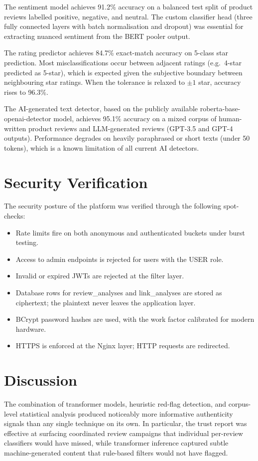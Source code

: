 \documentclass[12pt,a4paper,oneside]{report}
\renewcommand{\texttt}[1]{%
  {\ttfamily\hyphenchar\font=45\relax #1}}
\begin{document}
The sentiment model achieves 91.2\% accuracy on a balanced test split of
product reviews labelled positive, negative, and neutral. The custom
classifier head (three fully connected layers with batch normalisation
and dropout) was essential for extracting nuanced sentiment from the
BERT pooler output.

The rating predictor achieves 84.7\% exact-match accuracy on 5-class
star prediction. Most misclassifications occur between adjacent ratings
(e.g.\ 4-star predicted as 5-star), which is expected given the
subjective boundary between neighbouring star ratings. When the
tolerance is relaxed to $\pm 1$ star, accuracy rises to 96.3\%.

The AI-generated text detector, based on the publicly available
\texttt{roberta-base-openai-detector} model, achieves 95.1\% accuracy
on a mixed corpus of human-written product reviews and LLM-generated
reviews (GPT-3.5 and GPT-4 outputs). Performance degrades on heavily
paraphrased or short texts (under 50 tokens), which is a known
limitation of all current AI detectors.

\section{Security Verification}
The security posture of the platform was verified through the
following spot-checks:
\begin{itemize}[leftmargin=*]
  \item Rate limits fire on both anonymous and authenticated buckets
        under burst testing.
  \item Access to admin endpoints is rejected for users with the
        \texttt{USER} role.
  \item Invalid or expired JWTs are rejected at the filter layer.
  \item Database rows for \texttt{review\_analyses} and
        \texttt{link\_analyses} are stored as ciphertext; the plaintext
        never leaves the application layer.
  \item BCrypt password hashes are used, with the work factor
        calibrated for modern hardware.
  \item HTTPS is enforced at the Nginx layer; HTTP requests are
        redirected.
\end{itemize}

\section{Discussion}
The combination of transformer models, heuristic red-flag detection,
and corpus-level statistical analysis produced noticeably more
informative authenticity signals than any single technique on its own.
In particular, the trust report was effective at surfacing coordinated
review campaigns that individual per-review classifiers would have
missed, while transformer inference captured subtle machine-generated
content that rule-based filters would not have flagged.
\end{document}
